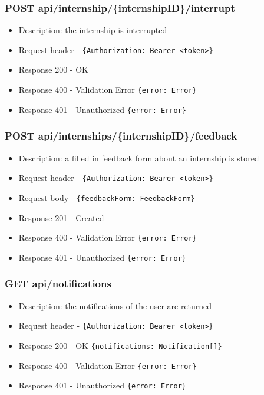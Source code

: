 \subsubsection{POST api/internship/\{internshipID\}/interrupt}
\begin{itemize}
    \item Description: the internship is interrupted
    \item Request header - \verb|{Authorization: Bearer <token>}|
    \item Response 200 - OK
    \item Response 400 - Validation Error \verb|{error: Error}|
    \item Response 401 - Unauthorized \verb|{error: Error}|
\end{itemize}

\subsubsection{POST api/internships/\{internshipID\}/feedback}
\begin{itemize}
    \item Description: a filled in feedback form about an internship is stored
    \item Request header - \verb|{Authorization: Bearer <token>}|
    \item Request body - \verb|{feedbackForm: FeedbackForm}|
    \item Response 201 - Created
    \item Response 400 - Validation Error \verb|{error: Error}|
    \item Response 401 - Unauthorized \verb|{error: Error}|
\end{itemize}

\subsubsection{GET api/notifications}
\begin{itemize}
    \item Description: the notifications of the user are returned
    \item Request header - \verb|{Authorization: Bearer <token>}|
    \item Response 200 - OK \verb|{notifications: Notification[]}|
    \item Response 400 - Validation Error \verb|{error: Error}|
    \item Response 401 - Unauthorized \verb|{error: Error}|
\end{itemize}

